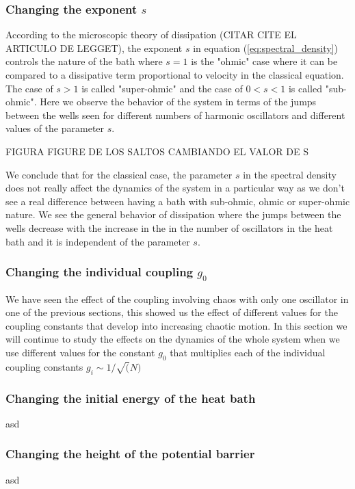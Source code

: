 \subsubsection{Changing the exponent $s$}
According to the microscopic theory of dissipation (CITAR CITE EL ARTICULO DE LEGGET), the exponent $s$ in equation (\ref{eq:spectral_density}) controls the nature of the bath where $s=1$ is the "ohmic" case where it can be compared to a dissipative term proportional to velocity in the classical equation. The case of $s>1$ is called "super-ohmic" and the case of $0<s<1$ is called "sub-ohmic". Here we observe the behavior of the system in terms of the jumps between the wells seen for different numbers of harmonic oscillators and different values of the parameter $s$. \par

FIGURA FIGURE DE LOS SALTOS CAMBIANDO EL VALOR DE S\par 

We conclude that for the classical case, the parameter $s$ in the spectral density does not really affect the dynamics of the system in a particular way as we don't see a real difference between having a bath with sub-ohmic, ohmic or super-ohmic nature. We see the general behavior of dissipation where the jumps between the wells decrease with the increase in the in the number of oscillators in the heat bath and it is independent of the parameter $s$.

\subsubsection{Changing the individual coupling $g_0$}
We have seen the effect of the coupling involving chaos with only one oscillator in one of the previous sections, this showed us the effect of different values for the coupling constants that develop into increasing chaotic motion. In this section we will continue to study the effects on the dynamics of the whole system when we use different values for the constant $g_0$ that multiplies each of the individual coupling constants $g_i \sim 1/\sqrt(N)$

\subsubsection{Changing the initial energy of the heat bath}
asd

\subsubsection{Changing the height of the potential barrier}
asd






